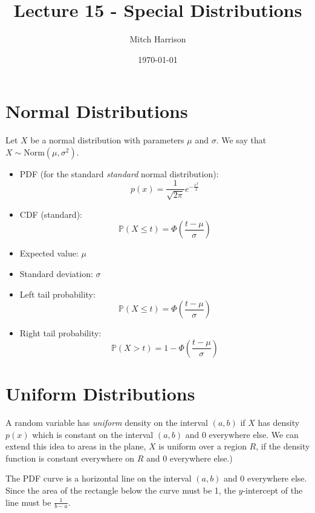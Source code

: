 \documentclass[titlepage, 12pt, leqno]{article}
\title{\Huge{Lecture 15 - Special Distributions}}
\author{\large{Mitch Harrison}}
\date{\today}
\begin{document}
\setlength{\parskip}{1\baselineskip}
\setlength{\parindent}{15pt}
\maketitle
\tableofcontents
\newpage


\section{Normal Distributions}

Let $X$ be a normal distribution with parameters $\mu$ and $\sigma$. We say that
$X \sim \text{Norm}(\mu, \sigma^2)$.
\begin{itemize}
    \item PDF (for the standard \textit{standard} normal distribution):
        \[
            p(x) = \frac{1}{\sqrt{2\pi}}e^{-\frac{x^2}{2}}
        \]
    \item CDF (standard):
        \[
            \mathbb{P}(X \le t) = \Phi\left(\frac{t-\mu}{\sigma}\right)
        \]
    \item Expected value: $\mu$
    \item Standard deviation: $\sigma$
    \item Left tail probability:
        \[
            \mathbb{P}(X \le t) = \Phi\left(\frac{t-\mu}{\sigma}\right)
        \]
    \item Right tail probability:
        \[
            \mathbb{P}(X > t) = 1-\Phi\left(\frac{t-\mu}{\sigma}\right)
        \]
\end{itemize}

\pagebreak
\section{Uniform Distributions}
A random variable has \textit{uniform} density on the interval $(a,b)$ if $X$ has
density $p(x)$ which is constant on the interval $(a,b)$ and 0 everywhere else.
We can extend this idea to areas in the plane, $X$ is uniform over a region $R$,
if the density function is constant everywhere on $R$ and 0 everywhere else.)

The PDF curve is a horizontal line on the interval $(a,b)$ and 0 everywhere else.
Since the area of the rectangle below the curve must be 1, the $y$-intercept of
the line must be $\frac{1}{b-a}$.
\end{document}

